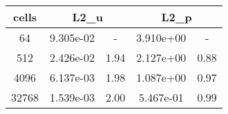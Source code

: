 \documentclass[10pt]{report}
\begin{document}
\begin{table}[H]
\begin{center}
\begin{tabular}{|c|c|c|c|c|} \hline
cells & 
\multicolumn{2}{|c|}{L2_u} & 
\multicolumn{2}{|c|}{L2_p}\\ \hline
64 & 9.305e-02 & - & 3.910e+00 & -\\ \hline
512 & 2.426e-02 & 1.94 & 2.127e+00 & 0.88\\ \hline
4096 & 6.137e-03 & 1.98 & 1.087e+00 & 0.97\\ \hline
32768 & 1.539e-03 & 2.00 & 5.467e-01 & 0.99\\ \hline
\end{tabular}
\end{center}
\end{table}
\end{document}
